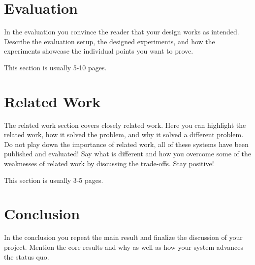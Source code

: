 \documentclass[a4paper,11pt,oneside]{report}
\begin{document}
\chapter{Evaluation}

In the evaluation you convince the reader that your design works as intended.
Describe the evaluation setup, the designed experiments, and how the
experiments showcase the individual points you want to prove.

This section is usually 5-10 pages.


\chapter{Related Work}

The related work section covers closely related work. Here you can highlight
the related work, how it solved the problem, and why it solved a different
problem. Do not play down the importance of related work, all of these
systems have been published and evaluated! Say what is different and how
you overcome some of the weaknesses of related work by discussing the 
trade-offs. Stay positive!

This section is usually 3-5 pages.


\chapter{Conclusion}

In the conclusion you repeat the main result and finalize the discussion of
your project. Mention the core results and why as well as how your system
advances the status quo.

\cleardoublepage
{}
{}
\printbibliography

%
%
\end{document}
